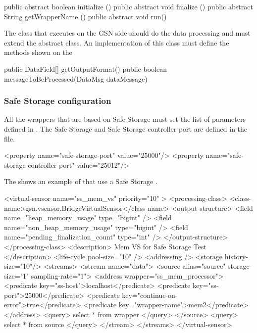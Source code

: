 \begin{javacode}[caption={Methods to implement for a Safe Storage Wrapper - Safe Storage Side}, label=listing:java:safestorage_methods_to_implement]
public abstract boolean initialize ()
public abstract void finalize ()
public abstract String getWrapperName () 
public abstract void run()
\end{javacode}

The class that executes on the GSN side should do the data processing and must extend the 
 abstract class.
An implementation of this class must define the methods shown on the 

\begin{javacode}[caption={Methods to implement for a Safe Storage Wrapper - GSN Side}, label=listing:java:safestorage_gsn_methods_to_implement]
public DataField[] getOutputFormat()
public boolean messageToBeProcessed(DataMsg dataMessage)
\end{javacode}

\subsubsection{Safe Storage configuration}

All the wrappers that are based on Safe Storage must set the list of parameters defined in .
The Safe Storage and Safe Storage controller port are defined in the  file.

\begin{xmlcode}[caption={Safe Storage ports}, label=listing:xml:safestorage_ports]
   <property name="safe-storage-port" value="25000"/>
   <property name="safe-storage-controller-port" value="25012"/>
\end{xmlcode}

The  shows an example of \vsd that use a Safe Storage \wrapper.

\begin{xmlcode}[caption={Sample of Email Notification VSD file}, label=listing:xml:safestorage_vsd]
<virtual-sensor name="ss_mem_vs" priority="10" >
	<processing-class>
		<class-name>gsn.vsensor.BridgeVirtualSensor</class-name>
		<output-structure>
			<field name="heap_memory_usage" type="bigint" />
			<field name="non_heap_memory_usage" type="bigint" />
			<field name="pending_finalization_count" type="int" />
		</output-structure>
	</processing-class>
	<description> Mem VS for Safe Storage Test </description>
	<life-cycle pool-size="10" />
	<addressing />
	<storage history-size="10"/>
	<streams>
		<stream name="data">
			<source alias="source" storage-size="1" sampling-rate="1">
				<address wrapper="ss_mem_processor">
					<predicate key="ss-host">localhost</predicate>
					<predicate key="ss-port">25000</predicate>
					<predicate key="continue-on-error">true</predicate>
					<predicate key="wrapper-name">mem2</predicate>
				</address>
				<query> select * from wrapper </query>
			</source>
			<query> select * from source </query>
		</stream>
	</streams>
</virtual-sensor>
\end{xmlcode}

